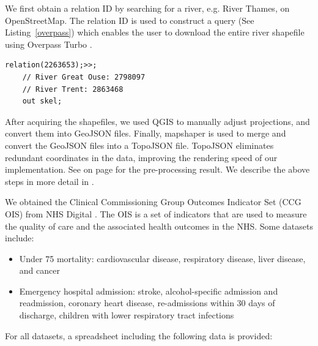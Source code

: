 We first obtain a relation ID by searching for a river, e.g. River Thames, on OpenStreetMap. The relation ID is used to construct a query (See Listing~\ref{overpass}) which enables the user to download the entire river shapefile using Overpass Turbo \cite{overpassturboOverpass}.

\begin{lstlisting}[caption={The query that downloads the shapefile of River Thames from OpenStreetMap via the Overpass Turbo API.}, label={overpass},captionpos=b]
    relation(2263653);>>;
    // River Great Ouse: 2798097
    // River Trent: 2863468
    out skel;
\end{lstlisting}

After acquiring the shapefiles, we used QGIS \cite{qgisWelcome} to manually adjust projections, and convert them into GeoJSON files. Finally, mapshaper \cite{blochMapshaper} is used to merge and convert the GeoJSON files into a TopoJSON \cite{TopoJSON} file. TopoJSON eliminates redundant coordinates in the data, improving the rendering speed of our implementation. See  on page \pageref{table:pre-processing_result} for the pre-processing result. We describe the above steps in more detail in .

We obtained the Clinical Commissioning Group Outcomes Indicator Set (CCG OIS) from NHS Digital \cite{nhsdigitalClinical}. The OIS is a set of indicators that are used to measure the quality of care and the associated health outcomes in the NHS. Some datasets include:
\begin{itemize}
    \item Under 75 mortality: cardiovascular disease, respiratory disease, liver disease, and cancer
    \item Emergency hospital admission: stroke, alcohol-specific admission and readmission, coronary heart disease, re-admissions within 30 days of discharge, children with lower respiratory tract infections
\end{itemize}

For all datasets, a spreadsheet including the following data is provided:


